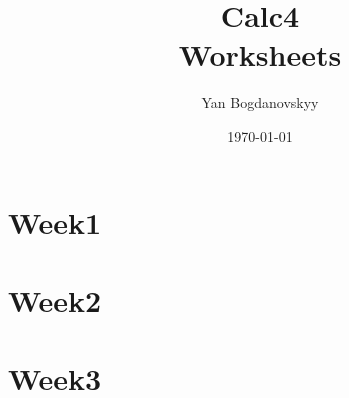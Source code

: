 \documentclass{report}
\title{\Huge{Calc4}\\ Worksheets}
\author{\huge{Yan Bogdanovskyy}}
\date{\today}
\begin{document}
\maketitle
\tableofcontents
\pagebreak

\chapter{Week1}


\chapter{Week2}


\chapter{Week3}

\end{document}
